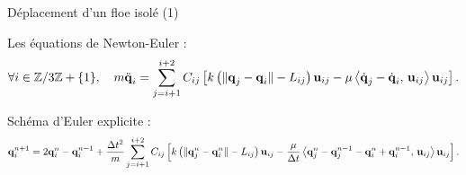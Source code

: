 \begin{frame}{Déplacement d'un floe isolé (1)}


    Les équations de Newton-Euler :
    \begin{align*}
        \forall i \in \mathbb{Z}/3\mathbb{Z}+\{1\}, \quad m \ddot{\bm{\mathrm{q}}}_i = \sum_{j=i+1}^{i+2}C_{ij} \left[  k \left( \Vert \bm{\mathrm{q}}_j - \bm{\mathrm{q}}_i \Vert - L_{ij} \right) \bm{\mathrm{u}}_{ij} - \mu \left\langle \dot{\bm{\mathrm{q}}}_j - \dot{\bm{\mathrm{q}}}_i, \, \bm{\mathrm{u}}_{ij}  \right\rangle  \bm{\mathrm{u}}_{ij}  \right] . 
    \end{align*}

    Schéma d’Euler explicite :
    \begin{align*} \label{eq:systeme2D}
        \bm{\mathrm{q}}_{i}^{n+1} = 2\bm{\mathrm{q}}_{i}^{n}-\bm{\mathrm{q}}_{i}^{n-1} + \frac{\Delta t^2}{m} \sum_{j=i+1}^{i+2}C_{ij}\left[ k \left( \Vert \bm{\mathrm{q}}_j^n - \bm{\mathrm{q}}_i^n \Vert - L_{ij} \right) \bm{\mathrm{u}}_{ij} - \frac{\mu}{\Delta t} \left\langle \bm{\mathrm{q}}_{j}^{n}-\bm{\mathrm{q}}_{j}^{n-1} - \bm{\mathrm{q}}_{i}^{n}+\bm{\mathrm{q}}_{i}^{n-1}, \, \bm{\mathrm{u}}_{ij} \right\rangle  \bm{\mathrm{u}}_{ij}  \right].
    \end{align*}
    
\end{frame}


